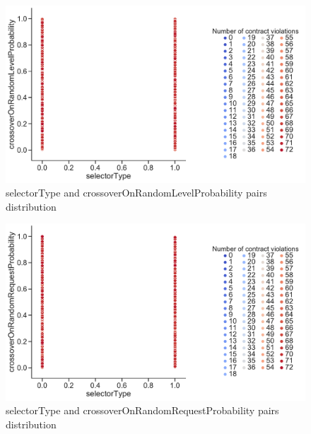 \begin{figure}
	\centering
	\includegraphics[width=\textwidth]{images/PairsDistr/selectorType_crossoverOnRandomLevelProbability.pdf}
	\caption[selectorType and crossoverOnRandomLevelProbability pairs distribution]{selectorType and crossoverOnRandomLevelProbability pairs distribution}
	\label{fig:selectorType_crossoverOnRandomLevelProbability_pair}
\end{figure}
\begin{figure}
	\centering
	\includegraphics[width=\textwidth]{images/PairsDistr/selectorType_crossoverOnRandomRequestProbability.pdf}
	\caption[selectorType and crossoverOnRandomRequestProbability pairs distribution]{selectorType and crossoverOnRandomRequestProbability pairs distribution}
	\label{fig:selectorType_crossoverOnRandomRequestProbability_pair}
\end{figure}
